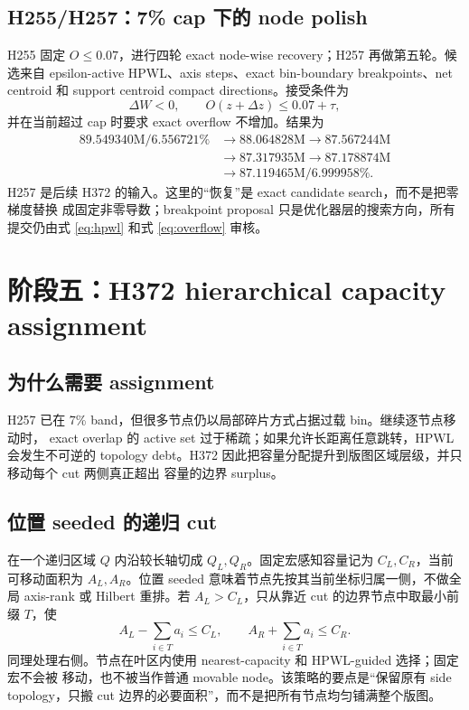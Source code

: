 \documentclass[UTF8,a4paper,11pt]{ctexrep}
\begin{document}
\section{H255/H257：7\% cap 下的 node polish}
H255 固定 $O\le0.07$，进行四轮 exact node-wise recovery；H257 再做第五轮。候选来自
epsilon-active HPWL、axis steps、exact bin-boundary breakpoints、net centroid 和
support centroid compact directions。接受条件为
\begin{equation}
  \Delta W<0,
  \qquad O(z+\Delta z)\le0.07+\tau,
  \label{eq:feasible_accept}
\end{equation}
并在当前超过 cap 时要求 exact overflow 不增加。结果为
\[
\begin{aligned}
  89.549340\text{M}/6.556721\%
  &\rightarrow88.064828\text{M}
   \rightarrow87.567244\text{M}\\
  &\rightarrow87.317935\text{M}
   \rightarrow87.178874\text{M}\\
  &\rightarrow\boxed{87.119465\text{M}/6.999958\%}.
\end{aligned}
\]
H257 是后续 H372 的输入。这里的“恢复”是 exact candidate search，而不是把零梯度替换
成固定非零导数；breakpoint proposal 只是优化器层的搜索方向，所有提交仍由式
\eqref{eq:hpwl} 和式 \eqref{eq:overflow} 审核。

\chapter{阶段五：H372 hierarchical capacity assignment}

\section{为什么需要 assignment}
H257 已在 7\% band，但很多节点仍以局部碎片方式占据过载 bin。继续逐节点移动时，
exact overlap 的 active set 过于稀疏；如果允许长距离任意跳转，HPWL 会发生不可逆的
topology debt。H372 因此把容量分配提升到版图区域层级，并只移动每个 cut 两侧真正超出
容量的边界 surplus。

\section{位置 seeded 的递归 cut}
在一个递归区域 $Q$ 内沿较长轴切成 $Q_L,Q_R$。固定宏感知容量记为 $C_L,C_R$，当前
可移动面积为 $A_L,A_R$。位置 seeded 意味着节点先按其当前坐标归属一侧，不做全局 axis-rank
或 Hilbert 重排。若 $A_L>C_L$，只从靠近 cut 的边界节点中取最小前缀 $T$，使
\begin{equation}
 A_L-\sum_{i\in T}a_i\le C_L,
 \qquad
 A_R+\sum_{i\in T}a_i\le C_R.
 \label{eq:surplus}
\end{equation}
同理处理右侧。节点在叶区内使用 nearest-capacity 和 HPWL-guided 选择；固定宏不会被
移动，也不被当作普通 movable node。该策略的要点是“保留原有 side topology，只搬 cut
边界的必要面积”，而不是把所有节点均匀铺满整个版图。
\end{document}

